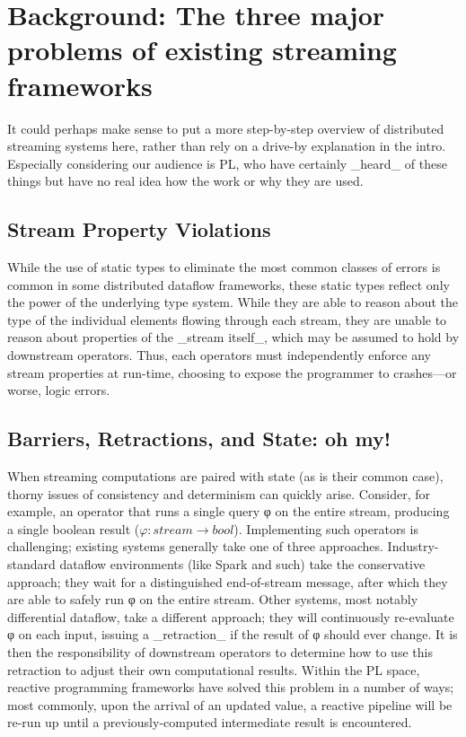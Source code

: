 \section{Background: The three major problems of existing streaming frameworks}
\label{sec:background}

It could perhaps make sense to put a more step-by-step overview of distributed streaming systems here, rather than rely on a drive-by explanation in the intro. Especially considering our audience is PL, who have certainly _heard_ of these things but have no real idea how the work or why they are used. 

\subsection{Stream Property Violations}

While the use of static types to eliminate the most common classes of errors is common in some distributed dataflow frameworks, these static types reflect only the power of the underlying type system. While they are able to reason about the type of the individual elements flowing through each stream, they are unable to reason about properties of the _stream itself_, which may be assumed to hold by downstream operators. Thus, each operators must independently enforce any stream properties at run-time, choosing to expose the programmer to crashes---or worse, logic errors.

\subsection{Barriers, Retractions, and State: oh my!}

When streaming computations are paired with state (as is their common case), thorny issues of consistency and determinism can quickly arise.  Consider, for example, an operator that runs a single query φ on the entire stream, producing a single boolean result ($φ : stream → bool$). Implementing such operators is challenging; existing systems generally take one of three approaches.  Industry-standard dataflow environments (like Spark and such) take the conservative approach; they wait for a distinguished end-of-stream message, after which they are able to safely run φ on the entire stream.  Other systems, most notably differential dataflow, take a different approach; they will continuously re-evaluate φ on each input, issuing a _retraction_ if the result of φ should ever change.  It is then the responsibility of downstream operators to determine how to use this retraction to adjust their own computational results.  Within the PL space, reactive programming frameworks have solved this problem in a number of ways; most commonly, upon the arrival of an updated value, a reactive pipeline will be re-run up until a previously-computed intermediate result is encountered.


